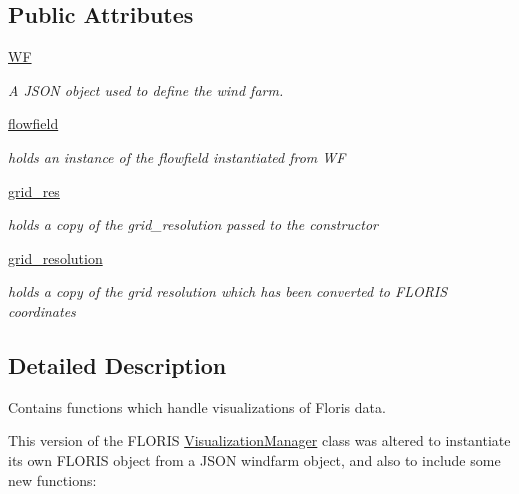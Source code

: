 \subsection*{Public Attributes}
\begin{DoxyCompactItemize}
\item 
\mbox{\hyperlink{classvisualization__manager___d_j_1_1_visualization_manager_a56add1b450c7ecd758b096117f593578}{WF}}
\begin{DoxyCompactList}\small\item\em A J\+S\+ON object used to define the wind farm. \end{DoxyCompactList}\item 
\mbox{\hyperlink{classvisualization__manager___d_j_1_1_visualization_manager_aadb6e88d03aa67b6045f66dcad66799c}{flowfield}}
\begin{DoxyCompactList}\small\item\em holds an instance of the flowfield instantiated from WF \end{DoxyCompactList}\item 
\mbox{\hyperlink{classvisualization__manager___d_j_1_1_visualization_manager_ad34898259a1773b5e43ab50eae783e1d}{grid\+\_\+res}}
\begin{DoxyCompactList}\small\item\em holds a copy of the grid\+\_\+resolution passed to the constructor \end{DoxyCompactList}\item 
\mbox{\hyperlink{classvisualization__manager___d_j_1_1_visualization_manager_ad5b8013f5cdf47f6384ae56186810e2b}{grid\+\_\+resolution}}
\begin{DoxyCompactList}\small\item\em holds a copy of the grid resolution which has been converted to F\+L\+O\+R\+IS coordinates \end{DoxyCompactList}\end{DoxyCompactItemize}


\subsection{Detailed Description}
Contains functions which handle visualizations of Floris data. 

This version of the F\+L\+O\+R\+IS \mbox{\hyperlink{classvisualization__manager___d_j_1_1_visualization_manager}{Visualization\+Manager}} class was altered to instantiate its own F\+L\+O\+R\+IS object from a J\+S\+ON windfarm object, and also to include some new functions\+:


